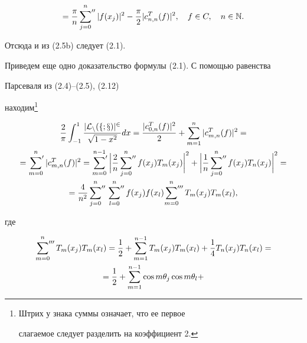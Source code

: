 \begin{pf}
\begin{multline*}
%


=\frac{\pi}{n}\sideset{}{''}\sum_{j=0}^n|f(x_j)|^2-


\frac{\pi}{2}|c_{n,n}^T(f)|^2,\quad f\in C,\quad n\in\N.


\end{multline*}


Отсюда и из (2.5b) следует (2.1).





Приведем еще одно доказательство формулы (2.1). С помощью равенства 


Парсеваля из (2.4)--(2.5), (2.12)


находим\footnote{Штрих у знака суммы означает, что ее первое 


слагаемое следует разделить на коэффициент 2.}


\begin{multline}


\frac{2}{\pi}\int_{-1}^1\frac{|\cal{L}_n(f;x)|^2}{\sqrt{1-x^2}}dx=


\frac{|c_{0,n}^T(f)|^2}{2}+\sum_{m=1}^n|c_{m,n}^T(f)|^2=\\


%


=\sideset{}{'}\sum_{m=0}^n |c_{m,n}^T(f)|^2


=\sideset{}{'}\sum_{m=0}^{n-1} \bigg|\frac{2}{n}


\sideset{}{''}\sum_{j=0}^n f(x_j)T_m(x_j)\bigg|^2


+\bigg|\frac{1}{n}\sideset{}{''}\sum_{j=0}^n f(x_j)T_n(x_j)\bigg|^2=\\


%


=\frac{4}{n^2}\sideset{}{''}\sum_{j=0}^n \sideset{}{''}\sum_{l=0}^n 


f(x_j)f(x_l)\sideset{}{'''}\sum_{m=0}^n T_m(x_j)T_m(x_l),


\end{multline}


где


\begin{multline}


\sideset{}{'''}\sum_{m=0}^n T_m(x_j)T_m(x_l)=


\frac{1}{2}+\sum_{m=1}^{n-1}T_{m}(x_j)T_m(x_l)+


\frac{1}{4}T_n(x_j)T_n(x_l)=\\


%


=\frac{1}{2}+\sum_{m=1}^{n-1}\cos m\theta_j \cos m\theta_l+



\end{multline}
\end{pf}
